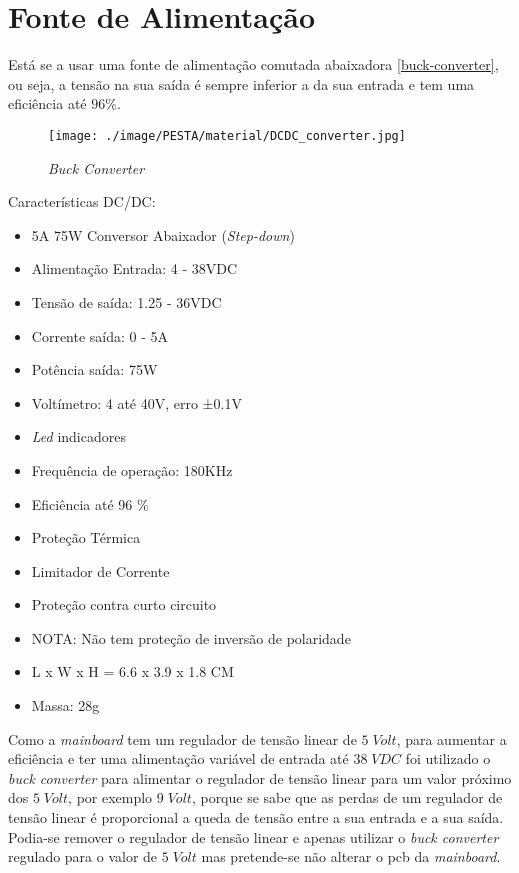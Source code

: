 \section{Fonte de Alimentação}
Está se a usar uma fonte de alimentação comutada abaixadora \autoref{buck-converter}, ou seja, a tensão na sua saída é sempre inferior a da sua entrada e tem uma eficiência até $96\%$.
\\
\begin{minipage}[!b]{.5\linewidth}
	\begin{figure}[H]
		\captionsetup{justification=raggedright,singlelinecheck=false}
		\flushleft
		\texttt{[image: ./image/PESTA/material/DCDC\_converter.jpg]}
		\caption{\textit{Buck Converter}}
		\label{buck-converter}
	\end{figure}
\end{minipage}
\begin{minipage}[!b]{.5\linewidth}
\small
Características DC/DC:
	\begin{itemize}
		\setlength\itemsep{-0.5em}
		\footnotesize
		\item 5A 75W Conversor Abaixador (\textit{Step-down})
		\item Alimentação Entrada: 4 - 38VDC
		\item Tensão de saída: 1.25 - 36VDC
		\item Corrente saída: 0 - 5A
		\item Potência saída: 75W
		\item Voltímetro: 4 até 40V, erro ±0.1V
		\item \textit{Led} indicadores
		\item Frequência de operação: 180KHz
		\item Eficiência até 96 \%
		\item Proteção Térmica
		\item Limitador de Corrente
		\item Proteção contra curto circuito
		\item NOTA: Não tem proteção de inversão de polaridade
		\item L x W x H = 6.6 x 3.9 x 1.8 CM
		\item Massa: 28g
	\end{itemize}
\end{minipage}
Como a \textit{mainboard} tem um regulador de tensão linear de $5 \; Volt$, para aumentar a eficiência e ter uma alimentação variável de entrada até $38 \; VDC$ foi utilizado o \textit{buck converter} para alimentar o regulador de tensão linear para um valor próximo dos $5 \; Volt$, por exemplo $9 \; Volt$, porque se sabe que as perdas de um regulador de tensão linear é proporcional a queda de tensão entre a sua entrada e a sua saída. Podia-se remover o regulador de tensão linear e apenas utilizar o \textit{buck converter} regulado para o valor de $5 \; Volt$ mas pretende-se não alterar o \acs{pcb} da \textit{mainboard}.

